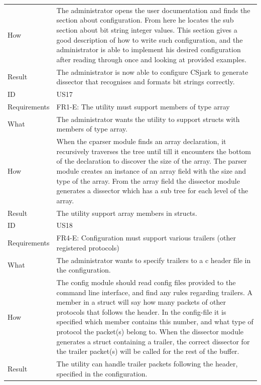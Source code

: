 \begin{table}[htbp]
{\begin{tabularx}{1.2\textwidth}{l X}
	How & The administrator opens the user documentation and finds the section about configuration. From here he locates the sub section about \gls{bit string}
	 integer values. This section gives a good description of how to write such configuration, and the administrator is able to implement his desired configuration
	after reading through once and looking at provided examples.  \\
	Result & The administrator is now able to configure CSjark to generate \gls{dissector} that recognises and formats \glspl{bit string} correctly. \\
	\midrule
	ID & US17 \\
	Requirements & FR1-E: The \gls{utility} must support \glspl{member} of type \gls{array} \\
	What & The administrator wants the \gls{utility} to support \glspl{struct} with \glspl{member} of type \gls{array}. \\
	How & When the cparser module finds an \gls{array} declaration, it recursively traverses the tree until till it encounters the bottom of the declaration 
	to discover the size of the \gls{array}. The \gls{parser} module creates an instance of an \gls{array} field with the size and type of the \gls{array}. From the \gls{array} field
	the \gls{dissector} module generates a \gls{dissector} which has a sub tree for each level of the \gls{array}. \\
	Result & The \gls{utility} support \gls{array} \glspl{member} in \glspl{struct}. \\
	\midrule
	ID & US18 \\
	Requirements & FR4-E: Configuration must support various trailers (other registered \glspl{protocol}) \\
	What & The administrator wants to specify trailers to a \Gls{c} \gls{header} file in the configuration. \\
	How & The config module should read config files provided to the command line interface, and find any rules regarding trailers. A \gls{member} in a \gls{struct}
	will say how many \glspl{packet} of other \glspl{protocol} that follows the \gls{header}. In the config-file it is specified which \gls{member} contains this number, and what
 	type of \gls{protocol} the \gls{packet}(s) belong to. When the \gls{dissector} module generates a \gls{struct} containing a trailer, the correct \gls{dissector} for the trailer \gls{packet}(s) 
	will be called for the rest of the buffer. \\
	Result & The \gls{utility} can handle trailer \glspl{packet} following the \gls{header}, specified in the configuration. \\
	\bottomrule
\end{tabularx}}
\end{table}

